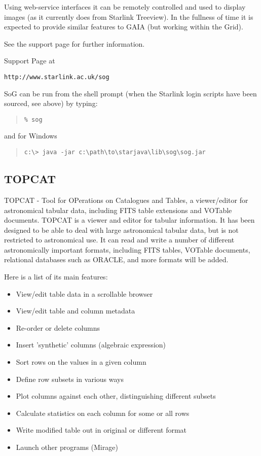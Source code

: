 \documentclass[twoside,11pt]{article}
\newcommand{\htmladdnormallink}[2]{#1}
\newcommand{\latex}[1]{#1}
\newcommand{\xlabel}[1]{}
\renewcommand{\_}{\texttt{\symbol{95}}}
\begin{document}
Using web-service interfaces it can be remotely controlled and used to 
display images (as it currently does from Starlink Treeview). In the 
fullness of time it is expected to provide similar features to GAIA 
(but working within the Grid).

See the support page for further information.

Support Page at 

\htmladdnormallink{\texttt{http://www.starlink.ac.uk/sog}}{http://www.starlink.ac.uk/sog}

SoG can be run from the shell prompt (when the Starlink login scripts have 
been sourced, see above) by typing:

\begin{quote}
\begin{verbatim}
% sog
\end{verbatim}
\end{quote}

and for Windows

\begin{quote}
\begin{verbatim}
c:\> java -jar c:\path\to\starjava\lib\sog\sog.jar
\end{verbatim}
\end{quote}

\subsection{\label{topcat}\xlabel{topcat}TOPCAT} 

TOPCAT - Tool for OPerations on Catalogues and Tables, a viewer/editor for 
astronomical tabular data, including FITS table extensions and 
VOTable documents. TOPCAT is a viewer and editor for tabular information. 
It has been designed to be able to deal with large astronomical tabular data, 
but is not restricted to astronomical use. It can read and write a number of 
different astronomically important formats, including FITS tables, VOTable 
documents, relational databases such as ORACLE, and more formats will be added.

Here is a list of its main features:

\begin{itemize}
 \item View/edit table data in a scrollable browser
 \item View/edit table and column metadata
 \item Re-order or delete columns
 \item Insert 'synthetic' columns (algebraic expression)
 \item Sort rows on the values in a given column
 \item Define row subsets in various ways
 \item Plot columns against each other, distinguishing different subsets
 \item Calculate statistics on each column for some or all rows
 \item Write modified table out in original or different format
 \item Launch other programs (Mirage) 
\end{itemize}
\end{document}
